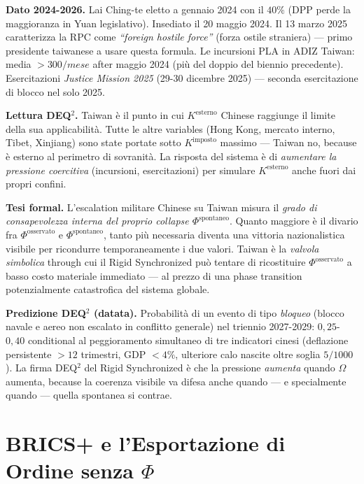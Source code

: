 \Proved{} \textbf{Dato 2024-2026.} Lai Ching-te eletto a gennaio 2024
con il \(40\%\) (DPP perde la maggioranza in Yuan legislativo).
Insediato il 20 maggio 2024. Il 13 marzo 2025 caratterizza la RPC come
\emph{``foreign hostile force''} (forza ostile straniera) --- primo
presidente taiwanese a usare questa formula. Le incursioni PLA in ADIZ
Taiwan: media \(> 300/mese\) after maggio 2024 (più del doppio del
biennio precedente). Esercitazioni \emph{Justice Mission 2025} (29-30
dicembre 2025) --- seconda esercitazione di blocco nel solo 2025.

\Hypoth{} \textbf{Lettura DEQ$^2$.} Taiwan è il punto in cui
\(K^{\text{esterno}}\) Chinese raggiunge il limite della sua
applicabilità. Tutte le altre variables (Hong Kong, mercato interno,
Tibet, Xinjiang) sono state portate sotto \(K^{\text{imposto}}\) massimo
--- Taiwan no, because è esterno al perimetro di sovranità. La risposta
del sistema è di \emph{aumentare la pressione coercitiva} (incursioni,
esercitazioni) per simulare \(K^{\text{esterno}}\) anche fuori dai
propri confini.

\Hypoth{} \textbf{Tesi formal.} L'escalation militare Chinese su Taiwan
misura il \emph{grado di consapevolezza interna del proprio collapse
\(\Phi^{\text{spontaneo}}\)}. Quanto maggiore è il divario fra
\(\Phi^{\text{osservato}}\) e \(\Phi^{\text{spontaneo}}\), tanto più
necessaria diventa una vittoria nazionalistica visibile per ricondurre
temporaneamente i due valori. Taiwan è la \emph{valvola simbolica}
through cui il Rigid Synchronized può tentare di ricostituire
\(\Phi^{\text{osservato}}\) a basso costo materiale immediato --- al
prezzo di una phase transition potenzialmente catastrofica del
sistema globale.

\Conj{} \textbf{Predizione DEQ$^2$ (datata).} Probabilità di un evento di
tipo \emph{bloqueo} (blocco navale e aereo non escalato in conflitto
generale) nel triennio 2027-2029: \(0{,}25\)-\(0{,}40\) conditional al
peggioramento simultaneo di tre indicatori cinesi (deflazione
persistente \(> 12\) trimestri, GDP \(< 4\%\), ulteriore calo nascite
oltre soglia \(5/1000\)). La firma DEQ$^2$ del Rigid Synchronized è che
la pressione \emph{aumenta} quando \(\Omega\) aumenta, because la
coerenza visibile va difesa anche quando --- e specialmente quando ---
quella spontanea si contrae.



\section{\texorpdfstring{BRICS+ e l'Esportazione di Ordine senza
\(\Phi\)}{BRICS+ e l'Esportazione di Ordine senza \textbackslash Phi}}\label{brics-e-lesportazione-di-ordine-senza-phi}


